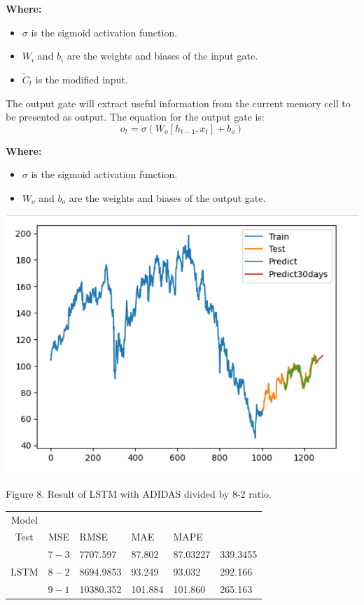 \documentclass[conference]{IEEEtran}
\begin{document}
{\textbf{Where:}
\begin{itemize}
    \item $\sigma$ is the sigmoid activation function.
    \item $W_i$ and $b_i$ are the weights and biases of the input gate.
    \item $\tilde{C}_t$ is the modified input.
\end{itemize}

The output gate will extract useful information from the current memory cell to be presented as output. The equation for the output gate is:
\[ o_t = \sigma(W_o [h_{t-1}, x_t] + b_o) \]

\textbf{Where:}
\begin{itemize}
    \item $\sigma$ is the sigmoid activation function.
    \item $W_o$ and $b_o$ are the weights and biases of the output gate.
\end{itemize}

\begin{center}
\includegraphics[max width=\linewidth]{LSTM_ADDYY_8-2.png}
\end{center}

Figure 8. Result of LSTM with ADIDAS divided by 8-2 ratio.

\begin{table}[H]
\centering
\begin{tabularx}{\columnwidth}{|c|c|X|X|X|X|}
\hline
Model & \begin{tabular}{c}
Train- \\
Test
\end{tabular} & MSE & RMSE & MAE & MAPE \\
\hline
\multirow{3}{*}{LSTM} & $7-3$ & 7707.597 & 87.802 & 87.03227 & 339.3455 \\
\cline{2-6}
 & $8-2$ & 8694.9853 & 93.249 & 93.032 & 292.166 \\
\cline{2-6}
 & $9-1$ & 10380.352 & 101.884 & 101.860 & 265.163 \\
\hline
\end{tabularx}
\end{table}

}
\end{document}
